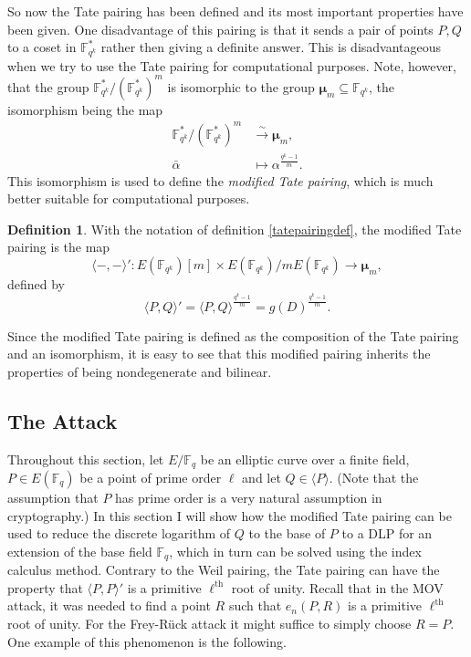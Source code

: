 \documentclass{article}
\numberwithin{equation}{section}
\theoremstyle{definition}
\newtheorem{definition}[theorem]{Definition}
\newcommand{\FF}[1]{{\mathbb F}_{#1}} %
\newcommand{\grgen}[1]{\langle #1 \rangle} %
\newcommand{\rou}[1]{\boldsymbol{\mu}_{#1}} %
\begin{document}
So now the Tate pairing has been defined and its most important properties have been given. One disadvantage of this pairing is that it sends a pair of points $P,Q$ to a coset in $\FF{q^k}^*$ rather then giving a definite answer. This is disadvantageous when we try to use the Tate pairing for computational purposes. Note, however, that the group $\FF{q^k}^*/(\FF{q^k}^*)^m$ is isomorphic to the group $\rou{m} \subseteq \FF{q^k}$, the isomorphism being the map \begin{align*} \FF{q^k}^*/(\FF{q^k}^*)^m &\overset{\sim}{\rightarrow} \rou{m},\\ \bar{\alpha} &\mapsto \alpha^{\frac{q^k-1}{m}}. \end{align*} This isomorphism is used to define the \emph{modified Tate pairing}, which is much better suitable for computational purposes. 

\begin{definition}\label{modTatepairing}
With the notation of definition \ref{tatepairingdef}, the modified Tate pairing is the map $$\langle -,- \rangle': E(\FF{q^k})[m] \times E(\FF{q^k})/mE(\FF{q^k}) \rightarrow \rou{m},$$ defined by $$\langle P,Q \rangle'=\langle P,Q \rangle ^{\frac{q^k-1}{m}} = g(D)^{\frac{q^k-1}{m}}.$$ 
\end{definition}

Since the modified Tate pairing is defined as the composition of the Tate pairing and an isomorphism, it is easy to see that this modified pairing inherits the properties of being nondegenerate and bilinear. 




\subsection{The Attack}\label{Frey-Ruckattack}
Throughout this section, let $E/\FF{q}$ be an elliptic curve over a finite field, $P\in E(\FF{q})$ be a point of prime order $\ell$ and let $Q \in \grgen{P}$. (Note that the assumption that $P$ has prime order is a very natural assumption in cryptography.) In this section I will show how the modified Tate pairing can be used to reduce the discrete logarithm of $Q$ to the base of $P$ to a DLP for an extension of the base field $\FF{q}$, which in turn can be solved using the index calculus method. Contrary to the Weil pairing, the Tate pairing can have the property that $\langle P,P \rangle'$ is a primitive $\ell^\text{th}$ root of unity. Recall that in the MOV attack, it was needed to find a point $R$ such that $e_n(P,R)$ is a primitive $\ell^\text{th}$ root of unity. For the Frey-R\"uck attack it might suffice to simply choose $R=P$. One example of this phenomenon is the following. 
\end{document}
